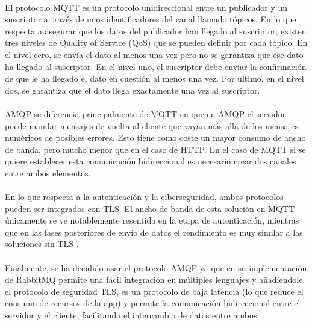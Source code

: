 \paragraph{}
El protocolo MQTT es un protocolo unidireccional entre un publicador y un suscriptor a través de unos identificadores del canal llamado tópicos. En lo que respecta a asegurar que los datos del publicador han llegado al suscriptor, existen tres niveles de Quality of Service (QoS) que se pueden definir por cada tópico. En el nivel cero, se envía el dato al menos una vez pero no se garantiza que ese dato ha llegado al suscriptor. En el nivel uno, el suscriptor debe enviar la confirmación de que le ha llegado el dato en cuestión al menos una vez. Por último, en el nivel dos, se garantiza que el dato llega exactamente una vez al suscriptor.

\paragraph{}
AMQP se diferencia principalmente de MQTT en que en AMQP el servidor puede mandar mensajes de vuelta al cliente que vayan más allá de los mensajes numéricos de posibles errores. Esto tiene como coste un mayor consumo de ancho de banda, pero mucho menor que en el caso de HTTP. En el caso de MQTT si se quiere establecer esta comunicación bidireccional es necesario crear dos canales entre ambos elementos.

\paragraph{}
En lo que respecta a la autenticación y la ciberseguridad, ambos protocolos pueden ser integrados con TLS. El ancho de banda de esta solución en MQTT únicamente se ve notablemente resentida en la etapa de autenticación, mientras que en las fases posteriores de envío de datos el rendimiento es muy similar a las soluciones sin TLS \citep{hivemq}.

\paragraph{}
Finalmente, se ha decidido usar el protocolo AMQP ya que en su implementación de RabbitMQ permite una fácil integración en múltiples lenguajes y añadíendole el protocolo de seguridad TLS, es un protocolo de baja latencia (lo que reduce el consumo de recursos de la app) y permite la comunicación bidireccional entre el servidor y el cliente, facilitando el intercambio de datos entre ambos.

